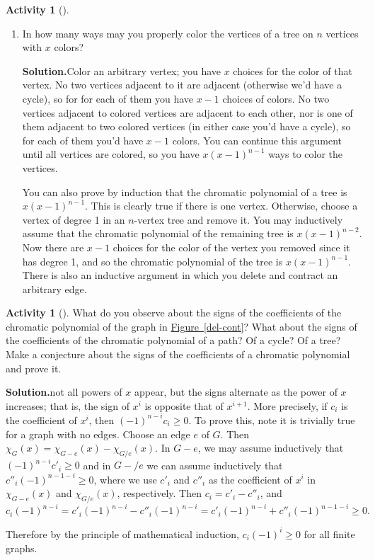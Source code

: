 \documentclass[10pt,]{book}
\theoremstyle{plain}
\theoremstyle{definition}
\newtheorem{activity}[project]{Activity}
\numberwithin{equation}{chapter}
\begin{document}
\begin{activity}[]
\begin{enumerate}[label=(\alph*)]
~\par
\item In how many ways may you properly color the vertices of a tree on \(n\) vertices with \(x\) colors?%
\par\medskip\noindent%
\textbf{Solution.}\quad Color an arbitrary vertex; you have \(x\) choices for the color of that vertex. No two vertices adjacent to it are adjacent (otherwise we'd have a cycle), so for for each of them you have \(x-1\) choices of colors. No two vertices adjacent to colored vertices are adjacent to each other, nor is one of them adjacent to two colored vertices (in either case you'd have a cycle), so for each of them you'd have \(x-1\) colors. You can continue this argument until all vertices are colored, so you have \(x(x-1)^{n-1}\) ways to color the vertices.%
\par
You can also prove by induction that the chromatic polynomial of a tree is \(x(x-1)^{n-1}\). This is clearly true if there is one vertex. Otherwise, choose a vertex of degree 1 in an \(n\)-vertex tree and remove it. You may inductively assume that the chromatic polynomial of the remaining tree is \(x(x-1)^{n-2}\). Now there are \(x-1\) choices for the color of the vertex you removed since it has degree 1, and so the chromatic polynomial of the tree is \(x(x-1)^{n-1}\). There is also an inductive argument in which you delete and contract an arbitrary edge.%

\end{enumerate}
\end{activity}
\begin{activity}[]\label{activity-225}
What do you observe about the signs of the coefficients of the chromatic polynomial of the graph in \hyperref[del-cont]{Figure~\ref{del-cont}}? What about the signs of the coefficients of the chromatic polynomial of a path? Of a cycle? Of a tree? Make a conjecture about the signs of the coefficients of a chromatic polynomial and prove it.%
\par\medskip\noindent%
\textbf{Solution.}\quad not all powers of \(x\) appear, but the signs alternate as the power of \(x\) increases; that is, the sign of \(x^i\) is opposite that of \(x^{i+1}\). More precisely, if \(c_i\) is the coefficient of \(x^i\), then \((-1)^{n-i}c_i\ge 0\). To prove this, note it is trivially true for a graph with no edges. Choose an edge \(e\) of \(G\). Then \(\chi_G(x) =
\chi_{G-e}(x)-\chi_{G/e}(x)\). In \(G-e\), we may assume inductively that \((-1)^{n-i}c'_i\ge0\) and in \(G-/e\) we can assume inductively that \(c''_i(-1)^{n-1-i}\ge0\), where we use \(c'_i\) and \(c''_i\) as the coefficient of \(x^i\) in \(\chi_{G-e}(x)\) and \(\chi_{G/e}(x)\), respectively. Then \(c_i=c'_i
-c''_i\), and%
\begin{equation*}
c_i(-1)^{n-i}=c'_i(-1)^{n-i}-c''_i(-1)^{n-i}=c'_i(-1)^{n-i}+c''_i(-1)^{n-1-i}
\ge0.
\end{equation*}
%
\par
Therefore by the principle of mathematical induction, \(c_i(-1)^i\ge0\) for all finite graphs.%
\end{activity}
\typeout{************************************************}
\typeout{************************************************}
\end{document}
